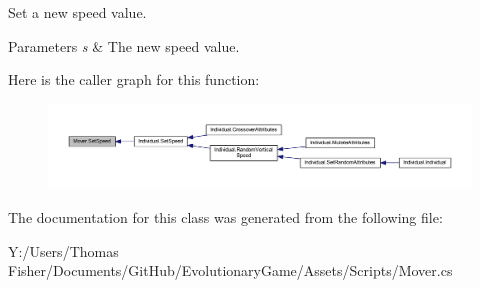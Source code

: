 Set a new speed value. 


\begin{DoxyParams}{Parameters}
{\em s} & The new speed value.\\
\hline
\end{DoxyParams}
Here is the caller graph for this function\+:\nopagebreak
\begin{figure}[H]
\begin{center}
\leavevmode
\includegraphics[width=350pt]{class_mover_a7a75a74f9bf6f20d3938c37bb95d8068_icgraph}
\end{center}
\end{figure}


The documentation for this class was generated from the following file\+:\begin{DoxyCompactItemize}
\item 
Y\+:/\+Users/\+Thomas Fisher/\+Documents/\+Git\+Hub/\+Evolutionary\+Game/\+Assets/\+Scripts/Mover.\+cs\end{DoxyCompactItemize}
